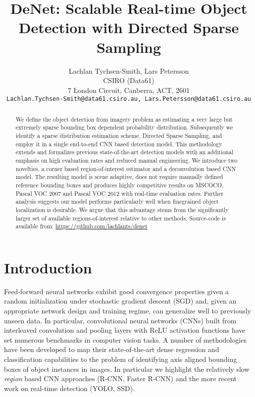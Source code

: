 \documentclass[10pt,twocolumn]{article}
\begin{document}
\title{DeNet: Scalable Real-time Object Detection with Directed Sparse Sampling}

\author{Lachlan Tychsen-Smith, Lars Petersson\\
CSIRO (Data61)\\
7 London Circuit, Canberra, ACT, 2601\\
{\tt\small Lachlan.Tychsen-Smith@data61.csiro.au, \tt\small Lars.Petersson@data61.csiro.au}
}

\maketitle
\begin{abstract}
We define the object detection from imagery problem as estimating a very large but extremely sparse bounding box dependent probability distribution. Subsequently we identify a sparse distribution estimation scheme, Directed Sparse Sampling, and employ it in a single end-to-end CNN based detection model. This methodology extends and formalizes previous state-of-the-art detection models with an additional emphasis on high evaluation rates and reduced manual engineering. We introduce two novelties, a corner based region-of-interest estimator and a deconvolution based CNN model. The resulting model is scene adaptive, does not require manually defined reference bounding boxes and produces highly competitive results on MSCOCO, Pascal VOC 2007 and Pascal VOC 2012 with real-time evaluation rates. Further analysis suggests our model performs particularly well when finegrained object localization is desirable. We argue that this advantage stems from the significantly larger set of available regions-of-interest relative to other methods.  Source-code is available from: \href{url}{https://github.com/lachlants/denet}
\end{abstract}

\section{Introduction}

Feed-forward neural networks exhibit good convergence properties given a random initialization under stochastic gradient descent (SGD) and, given an appropriate network design and training regime, can generalize well to previously unseen data\cite{lenet}. In particular, convolutional neural networks (CNNs) built from interleaved convolution and pooling layers with ReLU activation functions have set numerous benchmarks in computer vision tasks\cite{lenet}\cite{resnet}\cite{googlenet}. A number of methodologies have been developed to map their state-of-the-art dense regression and classification capabilities to the problem of identifying axis aligned bounding boxes of object instances in images. In particular we highlight the relatively slow \textit{region} based CNN approaches (R-CNN\cite{rcnn}, Faster R-CNN\cite{faster-rcnn}) and the more recent work on real-time detection (YOLO\cite{yolo}, SSD\cite{ssd}). 
\end{document}
